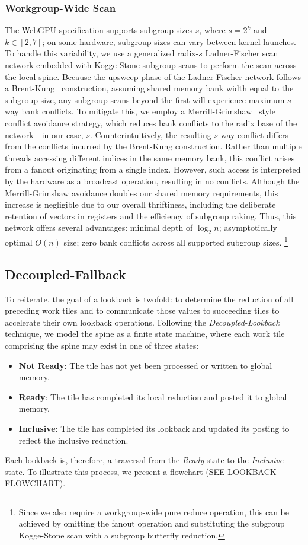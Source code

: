 \documentclass[sigconf]{acmart}
\begin{document}
\subsubsection{Workgroup-Wide Scan}
The WebGPU specification supports subgroup sizes $s$, where $s = 2^k$ and $k \in [2, 7]$; on some hardware, subgroup sizes can vary between kernel launches. To handle this variability, we use a generalized radix-$s$ Ladner-Fischer scan network embedded with Kogge-Stone subgroup scans to perform the scan across the local spine. Because the upsweep phase of the Ladner-Fischer network follows a Brent-Kung~\cite{1675982} construction, assuming shared memory bank width equal to the subgroup size, any subgroup scans beyond the first will experience maximum $s$-way bank conflicts. To mitigate this, we employ a Merrill-Grimshaw~\cite[Section 3.3.5]{Merrill2009} style conflict avoidance strategy, which reduces bank conflicts to the radix base of the network—in our case, $s$. Counterintuitively, the resulting $s$-way conflict differs from the conflicts incurred by the Brent-Kung construction. Rather than multiple threads accessing different indices in the same memory bank, this conflict arises from a fanout originating from a single index. However, such access is interpreted by the hardware as a broadcast operation, resulting in no conflicts. Although the Merrill-Grimshaw avoidance doubles our shared memory requirements, this increase is negligible due to our overall thriftiness, including the deliberate retention of vectors in registers and the efficiency of subgroup raking. Thus, this network offers several advantages: minimal depth of $\log_2 n$; asymptotically optimal $O(n)$ size; zero bank conflicts across all supported subgroup sizes. \footnote{Since we also require a workgroup-wide pure reduce operation, this can be achieved by omitting the fanout operation and substituting the subgroup Kogge-Stone scan with a subgroup butterfly reduction.}

\subsection{Decoupled-Fallback}
To reiterate, the goal of a lookback is twofold: to determine the reduction of all preceding work tiles and to communicate those values to succeeding tiles to accelerate their own lookback operations. Following the \emph{Decoupled-Lookback} technique, we model the spine as a finite state machine, where each work tile comprising the spine may exist in one of three states:
\begin{itemize}
    \item \textbf{Not Ready}: The tile has not yet been processed or written to global memory.
    \item \textbf{Ready}: The tile has completed its local reduction and posted it to global memory.
    \item \textbf{Inclusive}: The tile has completed its lookback and updated its posting to reflect the inclusive reduction.
\end{itemize}
Each lookback is, therefore, a traversal from the \emph{Ready} state to the \emph{Inclusive} state. To illustrate this process, we present a flowchart (SEE LOOKBACK FLOWCHART). 
\end{document}
